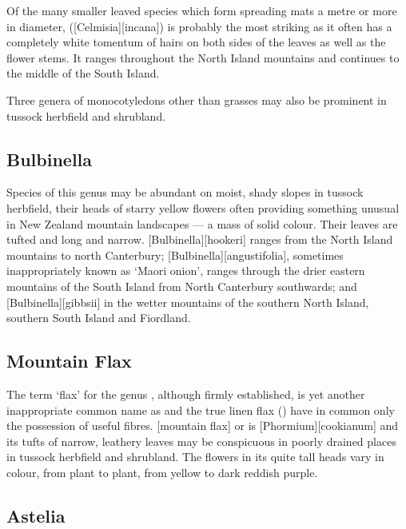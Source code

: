 Of the many smaller leaved species which form spreading mats a metre or more in diameter,  ([Celmisia][incana]) is probably the most striking as it often has a completely white tomentum of hairs on both sides of the leaves as well as the flower stems.
It ranges throughout the North Island mountains and continues to the middle of the South Island.

Three genera of monocotyledons other than grasses may also be prominent in tussock herbfield and shrubland.

\subsection{Bulbinella}

Species of this genus may be abundant on moist, shady slopes in tussock herbfield, their heads of starry yellow flowers often providing something unusual in New Zealand mountain landscapes --- a mass of solid colour.
Their leaves are tufted and long and narrow.
[Bulbinella][hookeri] ranges from the North Island mountains to north Canterbury; [Bulbinella][angustifolia], sometimes inappropriately known as `Maori onion', ranges through the drier eastern mountains of the South Island from North Canterbury southwards; and [Bulbinella][gibbsii] in the wetter mountains of the southern North Island, southern South Island and Fiordland.

\subsection{Mountain Flax}

The term `flax' for the genus , although firmly established, is yet another inappropriate common name as  and the true linen flax () have in common only the possession of useful fibres.
[mountain flax] or  is [Phormium][cookianum] and its tufts of narrow, leathery leaves may be conspicuous in poorly drained places in tussock herbfield and shrubland.
The flowers in its quite tall heads vary in colour, from plant to plant, from yellow to dark reddish purple.

\subsection{Astelia}

